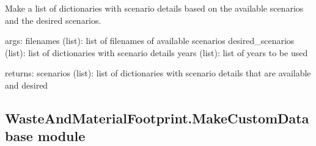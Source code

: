 \documentclass[letterpaper,10pt,english]{sphinxmanual}
\begin{document}
\begin{fulllineitems}
\label{\detokenize{WasteAndMaterialFootprint:WasteAndMaterialFootprint.FutureScenarios.grouper}}
\pysigstartsignatures
{}
\pysigstopsignatures
\end{fulllineitems}


\begin{fulllineitems}
\label{\detokenize{WasteAndMaterialFootprint:WasteAndMaterialFootprint.FutureScenarios.make_possible_scenario_list}}
\pysigstartsignatures
{}
\pysigstopsignatures
\sphinxAtStartPar
Make a list of dictionaries with scenario details based on the available scenarios and the desired scenarios.

\sphinxAtStartPar
args: filenames (list): list of filenames of available scenarios
desired\_scenarios (list): list of dictionaries with scenario details
years (list): list of years to be used

\sphinxAtStartPar
returns: scenarios (list): list of dictionaries with scenario details that are available and desired

\end{fulllineitems}



\subsection{WasteAndMaterialFootprint.MakeCustomDatabase module}
\label{\detokenize{WasteAndMaterialFootprint:module-WasteAndMaterialFootprint.MakeCustomDatabase}}\label{\detokenize{WasteAndMaterialFootprint:wasteandmaterialfootprint-makecustomdatabase-module}}
\end{document}
